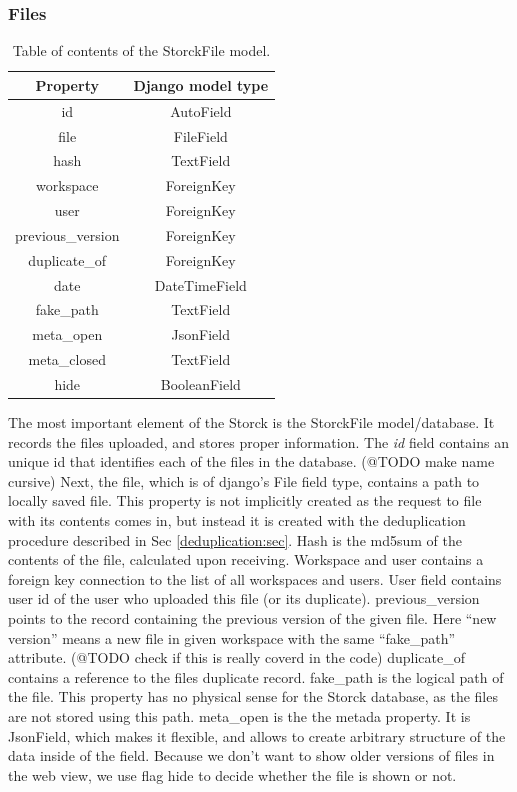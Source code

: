 \subsubsection{Files}

\begin{table}[h]
\begin{center}
\begin{tabular}{ |c|c| }
\hline
Property & Django model type \\
\hline
id & AutoField \\
file & FileField \\
hash & TextField \\
workspace & ForeignKey \\
user & ForeignKey \\
previous\_version & ForeignKey \\
duplicate\_of & ForeignKey \\
date & DateTimeField \\
fake\_path & TextField \\
meta\_open & JsonField \\
meta\_closed & TextField \\
hide & BooleanField \\
\hline
\end{tabular}
\caption{\label{tab:storck_filesfield}Table of contents of the StorckFile model.}
\end{center}
\end{table}

The most important element of the Storck is the StorckFile model/database. It records the files uploaded, and stores proper information.
The \textit{id} field contains an unique id that identifies each of the files in the database.
(@TODO make name cursive)
Next, the file, which is of django's File field type, contains a path to locally saved file.
This property is not implicitly created as the request to file with its contents comes in, but instead it is created with the deduplication procedure described in Sec \ref{deduplication:sec}.
Hash is the md5sum of the contents of the file, calculated upon receiving.
Workspace and user contains a foreign key connection to the list of all workspaces and users.
User field contains user id of the user who uploaded this file (or its duplicate).
previous\_version points to the record containing the previous version of the given file.
Here ``new version'' means a new file in given workspace with the same ``fake\_path'' attribute.
(@TODO check if this is really coverd in the code)
duplicate\_of contains a reference to the files duplicate record.
fake\_path is the logical path of the file. This property has no physical sense for the Storck database, as the files are not stored using this path.
meta\_open is the the metada property. It is JsonField, which makes it flexible, and allows to create arbitrary structure of the data inside of the field.
Because we don't want to show older versions of files in the web view, we use flag hide to decide whether the file is shown or not.


